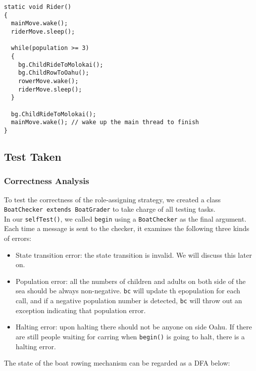 \documentclass{article}
\begin{document}
\begin{spacing}{1.1}
\begin{lstlisting}
static void Rider()
{
  mainMove.wake();
  riderMove.sleep();

  while(population >= 3)
  {
    bg.ChildRideToMolokai();
    bg.ChildRowToOahu();
    rowerMove.wake();
    riderMove.sleep();
  }

  bg.ChildRideToMolokai();
  mainMove.wake(); // wake up the main thread to finish
}
\end{lstlisting}

\subsection{Test Taken}
\subsubsection{Correctness Analysis}
To test the correctness of the role-assigning strategy, we created a class \texttt{BoatChecker extends BoatGrader} to take charge of all testing tasks.\\
In our \texttt{selfTest()}, we called \texttt{begin} using a \texttt{BoatChecker} as the final argument. Each time a message is sent to the checker, it examines the following three kinds of errors:\\
\begin{itemize}
  \item State transition error: the state transition is invalid. We will discuss this later on.\\
  \item Population error: all the numbers of children and adults on both side of the sea should be always non-negative. \texttt{bc} will update th epopulation for each call, and if a negative population number is detected, \texttt{bc} will throw out an exception indicating that population error.\\
  \item Halting error: upon halting there should not be anyone on side Oahu. If there are still people waiting for carring when \texttt{begin()} is going to halt, there is a halting error.\\
\end{itemize}
The state of the boat rowing mechanism can be regarded as a DFA below:\\
\begin{center}
\end{center}
\end{spacing}
\end{document}
